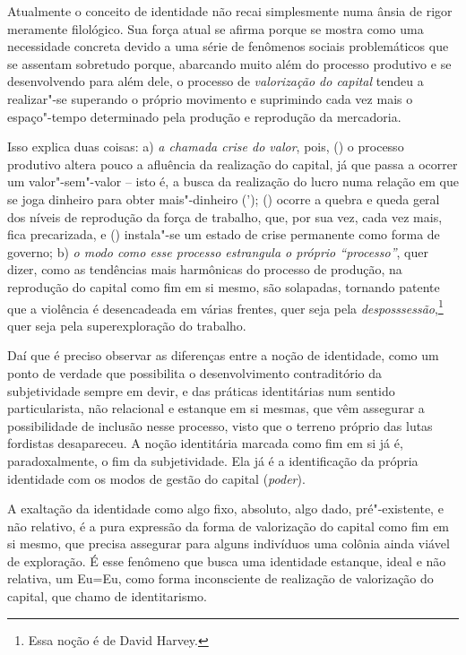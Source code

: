 Atualmente o conceito de
identidade não recai simplesmente numa ânsia de rigor meramente
filológico. Sua força atual se afirma porque se mostra como uma
necessidade concreta devido a uma série de fenômenos sociais
problemáticos que se assentam sobretudo porque, abarcando muito além do
processo produtivo e se desenvolvendo para além dele, o processo de
\emph{valorização do capital} tendeu a realizar"-se superando o próprio
movimento e suprimindo cada vez mais o espaço"-tempo determinado pela
produção e reprodução da mercadoria.

Isso explica duas coisas:
a) \emph{a chamada crise
do valor}, pois, () o processo produtivo altera pouco a
afluência da realização do capital, já que passa a ocorrer um
valor"-sem"-valor -- isto é, a busca da realização do lucro numa relação
em que se joga dinheiro para obter mais"-dinheiro ('); ()
ocorre a quebra e queda geral dos níveis de reprodução da força de
trabalho, que, por sua vez, cada vez mais, fica precarizada, e
() instala"-se um estado de crise permanente como forma de
governo; b) \emph{o modo como esse processo estrangula o próprio
``processo''}, quer dizer, como as tendências mais harmônicas do
processo de produção, na reprodução do capital como fim em si mesmo, são
solapadas, tornando patente que a violência é desencadeada em várias
frentes, quer seja pela
\emph{desposssessão},\footnote{Essa
  noção é de David Harvey.} quer seja pela superexploração do trabalho.

Daí que é preciso observar as
diferenças entre a noção de identidade, como um ponto de verdade que
possibilita o desenvolvimento contraditório da subjetividade sempre em
devir, e das práticas identitárias num sentido particularista, não
relacional e estanque em si mesmas, que vêm assegurar a possibilidade de
inclusão nesse processo, visto que o terreno próprio das lutas fordistas
desapareceu. A noção identitária marcada como fim em si já é,
paradoxalmente, o fim da subjetividade. Ela já é a identificação da
própria identidade com os modos de gestão do capital (\emph{poder}).

A exaltação da identidade como algo fixo, absoluto, algo dado,
pré"-existente, e não relativo, é a pura expressão da forma de
valorização do capital como fim em si mesmo, que precisa assegurar para
alguns indivíduos uma colônia ainda viável de exploração. É esse
fenômeno que busca uma identidade estanque, ideal e não relativa, um
Eu=Eu, como forma inconsciente de realização de valorização do capital,
que chamo de identitarismo.

